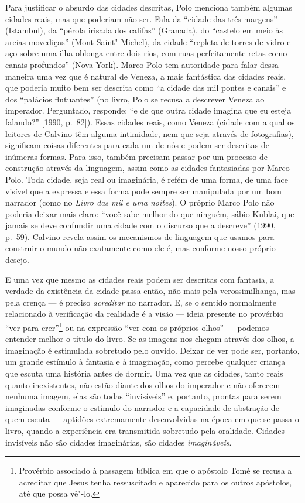 Para justificar o absurdo das cidades descritas, Polo menciona também
algumas cidades reais, mas que poderiam não ser. Fala da ``cidade das
três margens'' (Istambul), da ``pérola irisada dos califas'' (Granada),
do ``castelo em meio às areias movediças'' (Mont Saint"-Michel), da
cidade ``repleta de torres de vidro e aço sobre uma ilha oblonga entre
dois rios, com ruas perfeitamente retas como canais profundos'' (Nova
York). Marco Polo tem autoridade para falar dessa maneira uma vez que é
natural de Veneza, a mais fantástica das cidades reais, que poderia
muito bem ser descrita como ``a cidade das mil pontes e canais'' e dos
``palácios flutuantes'' (no livro, Polo se recusa a descrever Veneza ao
imperador. Perguntado, responde: ``e de que outra cidade imagina que eu
esteja falando?'' {[}1990, p.~82{]}). Essas cidades reais, como Veneza
(cidade com a qual os leitores de Calvino têm alguma intimidade, nem que
seja através de fotografias), significam coisas diferentes para cada um
de nós e podem ser descritas de inúmeras formas. Para isso, também
precisam passar por um processo de construção através da linguagem,
assim como as cidades fantasiadas por Marco Polo. Toda cidade, seja real
ou imaginária, é refém de uma forma, de uma face visível que a expressa
e essa forma pode sempre ser manipulada por um bom narrador (como no
\emph{Livro das mil e uma noites}). O próprio Marco Polo não poderia
deixar mais claro: ``você sabe melhor do que ninguém, sábio Kublai, que
jamais se deve confundir uma cidade com o discurso que a descreve''
(1990, p.~59). Calvino revela assim os mecanismos de linguagem que
usamos para construir o mundo não exatamente como ele é, mas conforme
nosso próprio desejo.

E uma vez que mesmo as cidades reais podem ser descritas com fantasia, a
verdade da existência da cidade passa então, não mais pela
verossimilhança, mas pela crença --- é preciso \emph{acreditar} no
narrador. E, se o sentido normalmente relacionado à verificação da
realidade é a visão --- ideia presente no provérbio ``ver para crer''\footnote{Provérbio associado à passagem bíblica em que
  o apóstolo Tomé se recusa a acreditar que Jesus tenha ressuscitado e
  aparecido para os outros apóstolos, até que possa vê"-lo.} ou
na expressão ``ver com os próprios olhos'' --- podemos entender melhor o
título do livro. Se as
imagens nos chegam através dos olhos, a imaginação é estimulada
sobretudo pelo ouvido. Deixar de ver pode ser, portanto, um grande
estímulo à fantasia e à imaginação, como percebe qualquer criança que
escuta uma história antes de dormir. Uma vez que as cidades, tanto reais
quanto inexistentes, não estão diante dos olhos do imperador e não
oferecem nenhuma imagem, elas são todas ``invisíveis'' e, portanto,
prontas para serem imaginadas conforme o estímulo do narrador e a
capacidade de abstração de quem escuta --- aptidões extremamente
desenvolvidas na época em que se passa o livro, quando a experiência era
transmitida sobretudo pela oralidade. Cidades invisíveis não são cidades
imaginárias, são cidades \emph{imagináveis}.


